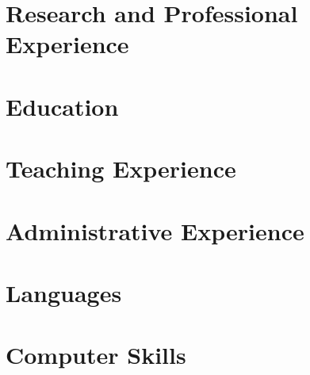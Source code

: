 \documentclass[10pt,a4paper,sans]{moderncv}
\begin{document}
\makecvtitle

\section*{}


\section{Research and Professional Experience}


\section{Education}


\pagebreak
\section{Teaching Experience}


\section{Administrative Experience}






\section{Languages}


\section{Computer Skills}


\clearpage
\end{document}
